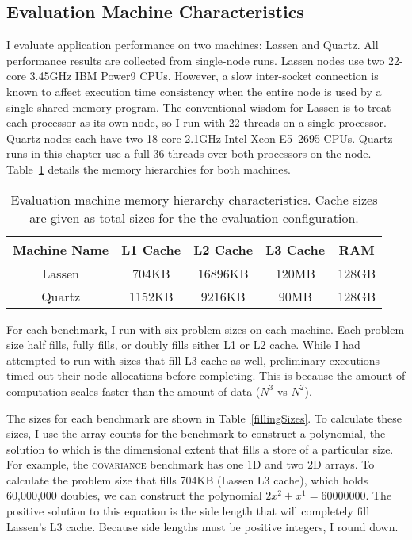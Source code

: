 \subsection{Evaluation Machine Characteristics}
\label{fillingSizesCalculation}
I evaluate application performance on two machines: Lassen and Quartz.
All performance results are collected from single-node runs.
Lassen nodes use two 22-core 3.45GHz IBM Power9 CPUs.
However, a slow inter-socket connection is known to affect execution time consistency when the entire node is used by a single shared-memory program.
The conventional wisdom for Lassen is to treat each processor as its own node, so I run with 22 threads on a single processor.
Quartz nodes each have two 18-core 2.1GHz Intel Xeon E5--2695  CPUs.
Quartz runs in this chapter use a full 36 threads over both processors on the node.
Table~\ref{machineDetails} details the memory hierarchies for both machines.

\begin{table}[t]
	\centering
\begin{tabular}{|c|c|c|c|c|}
\hline
\textbf{Machine Name} & \textbf{L1 Cache} & \textbf{L2 Cache} & \textbf{L3 Cache} & \textbf{RAM} \\
\hline 
Lassen & 704KB & 16896KB & 120MB & 128GB \\ %
\hline
Quartz & 1152KB & 9216KB & 90MB & 128GB \\ 
\hline
\end{tabular}
\caption{Evaluation machine memory hierarchy characteristics. Cache sizes are given as total sizes for the the evaluation configuration.}\label{machineDetails}
\end{table}

For each benchmark, I run with six problem sizes on each machine. 
Each problem size half fills, fully fills, or doubly fills either L1 or L2 cache.
While I had attempted to run with sizes that fill L3 cache as well, preliminary executions timed out their node allocations before completing.
This is because the amount of computation scales faster than the amount of data ($N^3$ vs $N^2$).


The sizes for each benchmark are shown in Table~\ref{fillingSizes}.
To calculate these sizes, I use the array counts for the benchmark to construct a polynomial, the solution to which is the dimensional extent that fills a store of a particular size.
For example, the \textsc{covariance} benchmark has one 1D and two 2D arrays. 
To calculate the problem size that fills 704KB (Lassen L3 cache), which holds 60,000,000 doubles, we can construct the polynomial $2x^2 + x^1 = 60000000$.
The positive solution to this equation is the side length that will completely fill Lassen's L3 cache.
Because side lengths must be positive integers, I round down.

